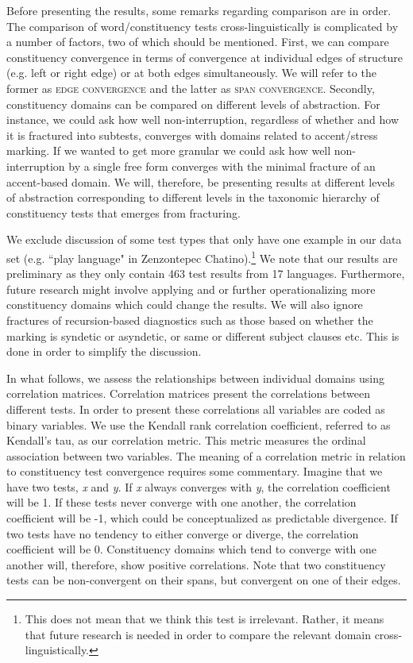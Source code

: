 \documentclass[output=paper,draftmode]{langscibook}
\begin{document}
Before presenting the results, some remarks regarding comparison are in order. The comparison of word/constituency tests cross-linguistically is complicated by a number of factors, two of which should be mentioned. First, we can compare constituency convergence in terms of convergence at individual edges of structure (e.g. left or right edge) or at both edges simultaneously. We will refer to the former as \textsc{edge convergence} and the latter as \textsc{span convergence}. 
Secondly, constituency domains can be compared on different levels of abstraction. For instance, we could ask how well non-interruption, regardless of whether and how it is fractured into subtests, converges with domains related to accent/stress marking. If we wanted to get more granular we could ask how well non-interruption by a single free form converges with the minimal fracture of an accent-based domain. We will, therefore, be presenting results at different levels of abstraction corresponding to different levels in the taxonomic hierarchy of constituency tests that emerges from fracturing.

We exclude discussion of some test types that only have one example in our data set (e.g. ``play language" in Zenzontepec Chatino).\footnote{This does not mean that we think this test is irrelevant. Rather, it means that future research is needed in order to compare the relevant domain cross-linguistically.} We note that our results are preliminary as they only contain 463 test results from 17 languages. Furthermore, future research might involve applying and or further operationalizing more constituency domains which could change the results. 
We will also ignore fractures of recursion-based diagnostics such as those based on whether the marking is syndetic or asyndetic, or same or different subject clauses etc. This is done in order to simplify the discussion.

In what follows, we assess the relationships between individual domains using correlation matrices. Correlation matrices present the correlations between different tests. In order to present these correlations all variables are coded as binary variables. We use the Kendall rank correlation coefficient, referred to as Kendall's tau, as our correlation metric. This metric measures the ordinal association between two variables.
The meaning of a correlation metric in relation to constituency test convergence requires some commentary. Imagine that we have two tests, \textit{x} and \textit{y}. If \textit{x} always converges with \textit{y}, the correlation coefficient will be 1. If these tests never converge with one another, the correlation coefficient will be -1, which could be conceptualized as predictable divergence. If two tests have no tendency to either converge or diverge, the correlation coefficient will be 0.
Constituency domains which tend to converge with one another will, therefore, show positive correlations. Note that two constituency tests can be non-convergent on their spans, but convergent on one of their edges. 
\end{document}

